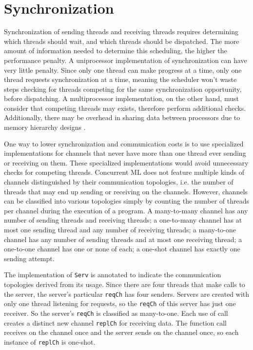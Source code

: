 \documentclass{article}
\begin{document}
\section{Synchronization}
Synchronization of sending threads and receiving threads
requires determining which threads should wait, and which threads should be dispatched.
The more amount of information needed
to determine this scheduling, the higher the performance penalty. A uniprocessor
implementation of synchronization can have very little penalty. Since only one thread can make
progress at a time, only one thread requests synchronization at a time, meaning the scheduler
won't waste steps checking for threads competing for the same synchronization opportunity,
before dispatching. A multiprocessor implementation, on the other hand, must consider that
competing threads may exists, therefore perform additional checks. Additionally, there may be 
overhead in sharing data between processors due to memory hierarchy designs \cite{}. 

One way to lower synchronization and communication costs is to use specialized implementations
for channels that never have more than one thread ever sending or receiving on them. These
specialized implementations would avoid unnecessary checks for competing threads.
Concurrent ML does not feature multiple kinds of channels distinguished by their communication
topologies, i.e. the number of threads that may end up sending or receiving on the channels.
However, channels can be classified into various topologies simply by counting the number of
threads per channel during the execution of a program.  A many-to-many channel has any number
of sending threads and receiving threads;
a one-to-many channel has at most one sending thread and
any number of receiving threads;
a many-to-one channel has any number of sending threads and at most one receiving thread;
a one-to-one channel has one or none of each;
a one-shot channel has exactly one sending attempt.

The implementation of \lstinline{Serv} is annotated to indicate the communication topologies
derived from its usage. Since there are four threads that make calls to the server, the
server's particular \lstinline{reqCh} has four senders.  Servers are created with only one
thread listening for requests, so the \lstinline{reqCh} of this server has just one receiver.
So the server's \lstinline{reqCh} is classified as many-to-one.
Each use of call creates a distinct
new channel \lstinline{replCh} for receiving data.  The function call receives on the channel
once and the server sends on the channel once, so each instance of \lstinline{replCh} is
one-shot.
\end{document}
